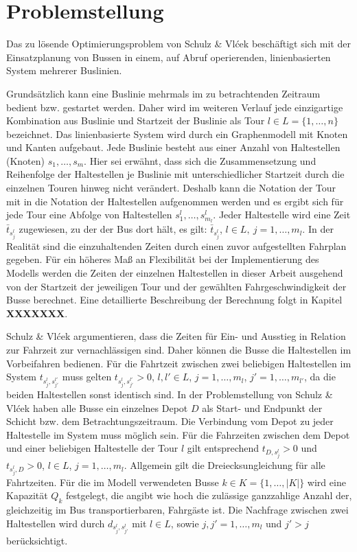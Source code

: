 \chapter{Problemstellung}
\label{chapter:3}
\label{chapter:Problemstellung}
Das zu lösende Optimierungsproblem von Schulz \& Vlćek beschäftigt sich mit der Einsatzplanung von Bussen in einem, auf Abruf operierenden, linienbasierten System mehrerer Buslinien. 

Grundsätzlich kann eine Buslinie mehrmals im zu betrachtenden Zeitraum bedient bzw. gestartet werden. 
Daher wird im weiteren Verlauf jede einzigartige Kombination aus Buslinie und Startzeit der Buslinie als Tour \( l \in L = \{1,  \dots , n\} \) bezeichnet. 
Das linienbasierte System wird durch ein Graphenmodell mit Knoten und Kanten aufgebaut. Jede Buslinie besteht aus einer Anzahl von Haltestellen (Knoten) $s_1, \dots, s_{m}$. Hier sei erwähnt, dass sich die Zusammensetzung und Reihenfolge der Haltestellen je Buslinie mit unterschiedlicher Startzeit durch die einzelnen Touren hinweg nicht verändert. Deshalb kann die Notation der Tour mit in die Notation der Haltestellen aufgenommen werden und es ergibt sich für jede Tour eine Abfolge von Haltestellen $s^l_1,  \dots , s^l_{m_l}$.
Jeder Haltestelle wird eine Zeit $\bar{t}_{s^l_j}$ zugewiesen, zu der der Bus dort hält, es gilt: $\bar{t}_{s^l_j}$, $l \in L,\ j = 1, \dots, m_l$.
In der Realität sind die einzuhaltenden Zeiten durch einen zuvor aufgestellten Fahrplan gegeben. Für ein höheres Maß an Flexibilität bei der Implementierung des Modells werden die Zeiten der einzelnen Haltestellen in dieser Arbeit ausgehend von der Startzeit der jeweiligen Tour und der gewählten Fahrgeschwindigkeit der Busse berechnet. Eine detaillierte Beschreibung der Berechnung folgt in Kapitel \textbf{XXXXXXX}.


Schulz \& Vlćek argumentieren, dass die Zeiten für Ein- und Ausstieg in Relation zur Fahrzeit zur vernachlässigen sind. Daher können die Busse die Haltestellen im Vorbeifahren bedienen.
Für die Fahrtzeit zwischen zwei beliebigen Haltestellen im System $t_{s^l_j, s^{l'}_{j'}}$ muss gelten $t_{s^l_j, s^{l'}_{j'}}> 0$, $l, l' \in L$, $j = 1, \dots, m_l$, $j' = 1, \dots, m_{l'}$, da die beiden Haltestellen sonst identisch sind.
In der Problemstellung von Schulz \& Vlćek haben alle Busse ein einzelnes Depot $D$ als Start- und Endpunkt der Schicht bzw. dem Betrachtungszeitraum. Die Verbindung vom Depot zu jeder Haltestelle im System muss möglich sein. Für die Fahrzeiten zwischen dem Depot und einer beliebigen Haltestelle der Tour $l$ gilt entsprechend $t_{D, s^l_j} > 0$ und $t_{s^l_j, D} > 0$, $l \in L$, $j = 1, \dots, m_l$. Allgemein gilt die Dreiecksungleichung für alle Fahrtzeiten.
Für die im Modell verwendeten Busse $k \in K = \{1, \dots, |K|\}$ wird eine Kapazität $Q_k$ festgelegt, die angibt wie hoch die zulässige ganzzahlige Anzahl der, gleichzeitig im Bus transportierbaren, Fahrgäste ist.
Die Nachfrage zwischen zwei Haltestellen wird durch $d_{s^l_j, s^l_{j'}}$ mit $l \in L$, sowie $j, j' = 1, \dots, m_l$ und $j' > j$ berücksichtigt.


